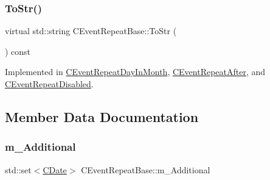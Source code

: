 \mbox{\label{class_c_event_repeat_base_acf60d2b0890fdb3e701c944b26186197}} 
\subsubsection{\texorpdfstring{To\+Str()}{ToStr()}}
{\footnotesize\ttfamily virtual std\+::string C\+Event\+Repeat\+Base\+::\+To\+Str (\begin{DoxyParamCaption}{ }\end{DoxyParamCaption}) const\hspace{0.3cm}{\ttfamily [pure virtual]}}



Implemented in \mbox{\hyperlink{class_c_event_repeat_day_in_month_a5ec4554d0d7c1c9a50cd1f37f0d76673}{C\+Event\+Repeat\+Day\+In\+Month}}, \mbox{\hyperlink{class_c_event_repeat_after_a367f534544d07fde2ded54374152b9c3}{C\+Event\+Repeat\+After}}, and \mbox{\hyperlink{class_c_event_repeat_disabled_a58cfa9f6921c351c85f747e80183842b}{C\+Event\+Repeat\+Disabled}}.



\subsection{Member Data Documentation}
\mbox{\label{class_c_event_repeat_base_a8080eddd346a489c9a04573761895d53}} 
\subsubsection{\texorpdfstring{m\+\_\+\+Additional}{m\_Additional}}
{\footnotesize\ttfamily std\+::set$<$\mbox{\hyperlink{class_c_date}{C\+Date}}$>$ C\+Event\+Repeat\+Base\+::m\+\_\+\+Additional}

\mbox{\label{class_c_event_repeat_base_a754e059274866f1338e68307894b1602}} 
